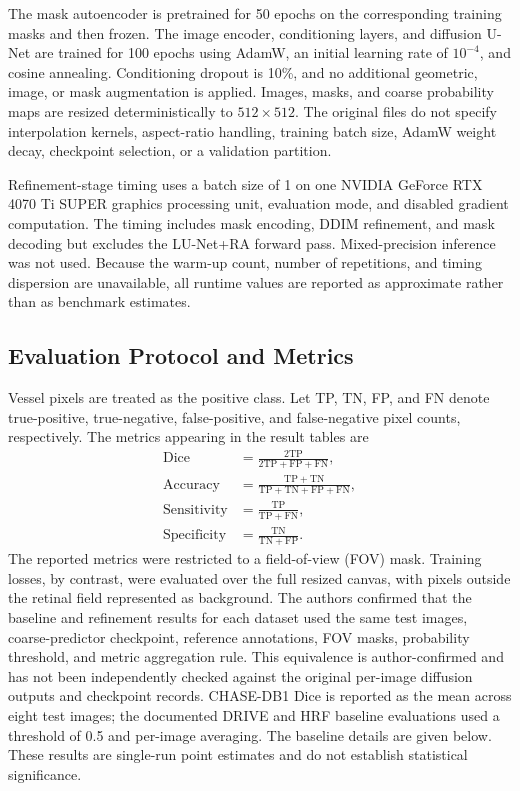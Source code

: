\documentclass[jimaging,article,submit,pdftex,moreauthors]
  {Definitions/mdpi}
\begin{document}
The mask autoencoder is pretrained for 50 epochs on the corresponding training masks and then frozen. The image encoder, conditioning layers, and diffusion U-Net are trained for 100 epochs using AdamW, an initial learning rate of $10^{-4}$, and cosine annealing. Conditioning dropout is 10\%, and no additional geometric, image, or mask augmentation is applied. Images, masks, and coarse probability maps are resized deterministically to $512\times512$. The original files do not specify interpolation kernels, aspect-ratio handling, training batch size, AdamW weight decay, checkpoint selection, or a validation partition.

Refinement-stage timing uses a batch size of 1 on one NVIDIA GeForce RTX 4070 Ti SUPER graphics processing unit, evaluation mode, and disabled gradient computation. The timing includes mask encoding, DDIM refinement, and mask decoding but excludes the LU-Net+RA forward pass. Mixed-precision inference was not used. Because the warm-up count, number of repetitions, and timing dispersion are unavailable, all runtime values are reported as approximate rather than as benchmark estimates.

\subsection{Evaluation Protocol and Metrics}
\label{sec:metrics}

Vessel pixels are treated as the positive class. Let TP, TN, FP, and FN denote true-positive, true-negative, false-positive, and false-negative pixel counts, respectively. The metrics appearing in the result tables are
\begin{align}
\mathrm{Dice} &= \frac{2\mathrm{TP}}{2\mathrm{TP}+\mathrm{FP}+\mathrm{FN}}, \\
\mathrm{Accuracy} &= \frac{\mathrm{TP}+\mathrm{TN}}
{\mathrm{TP}+\mathrm{TN}+\mathrm{FP}+\mathrm{FN}}, \\
\mathrm{Sensitivity} &= \frac{\mathrm{TP}}{\mathrm{TP}+\mathrm{FN}}, \\
\mathrm{Specificity} &= \frac{\mathrm{TN}}{\mathrm{TN}+\mathrm{FP}}.
\end{align}
The reported metrics were restricted to a field-of-view (FOV) mask. Training losses, by contrast, were evaluated over the full resized canvas, with pixels outside the retinal field represented as background. The authors confirmed that the baseline and refinement results for each dataset used the same test images, coarse-predictor checkpoint, reference annotations, FOV masks, probability threshold, and metric aggregation rule. This equivalence is author-confirmed and has not been independently checked against the original per-image diffusion outputs and checkpoint records. CHASE-DB1 Dice is reported as the mean across eight test images; the documented DRIVE and HRF baseline evaluations used a threshold of 0.5 and per-image averaging. The baseline details are given below. These results are single-run point estimates and do not establish statistical significance.
\end{document}
